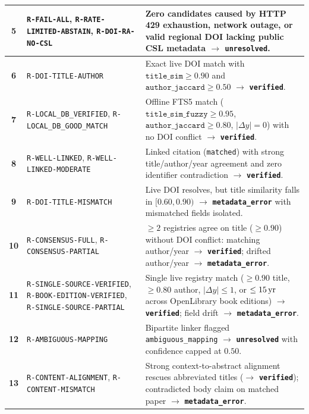 {\begin{longtable}{|C{0.11}|L{0.33}|L{0.56}|}
\hline
\textbf{5} & \texttt{R-FAIL-ALL}, \texttt{R-RATE-LIMITED-\allowbreak ABSTAIN}, \texttt{R-DOI-RA-NO-CSL} & Zero candidates caused by HTTP 429 exhaustion, network outage, or valid regional DOI lacking public CSL metadata $\rightarrow$ \textbf{\texttt{unresolved}}. \\
\hline
\textbf{6} & \texttt{R-DOI-TITLE-AUTHOR} & Exact live DOI match with $\texttt{title\_sim} \ge 0.90$ and $\texttt{author\_jaccard} \ge 0.50$ $\rightarrow$ \textbf{\texttt{verified}}. \\
\hline
\textbf{7} & \texttt{R-LOCAL\_DB\_VERIFIED}, \texttt{R-LOCAL\_DB\_GOOD\_MATCH} & Offline FTS5 match ($\texttt{title\_sim\_fuzzy} \ge 0.95$, $\texttt{author\_jaccard} \ge 0.80$, $|\Delta y| = 0$) with no DOI conflict $\rightarrow$ \textbf{\texttt{verified}}. \\
\hline
\textbf{8} & \texttt{R-WELL-LINKED}, \texttt{R-WELL-LINKED-\allowbreak MODERATE} & Linked citation (\texttt{matched}) with strong title/author/year agreement and zero identifier contradiction $\rightarrow$ \textbf{\texttt{verified}}. \\
\hline
\textbf{9} & \texttt{R-DOI-TITLE-\allowbreak MISMATCH} & Live DOI resolves, but title similarity falls in $[0.60, 0.90)$ $\rightarrow$ \textbf{\texttt{metadata\_error}} with mismatched fields isolated. \\
\hline
\textbf{10} & \texttt{R-CONSENSUS-FULL}, \texttt{R-CONSENSUS-\allowbreak PARTIAL} & $\ge 2$ registries agree on title ($\ge 0.90$) without DOI conflict: matching author/year $\rightarrow$ \textbf{\texttt{verified}}; drifted author/year $\rightarrow$ \textbf{\texttt{metadata\_error}}. \\
\hline
\textbf{11} & \texttt{R-SINGLE-SOURCE-\allowbreak VERIFIED}, \texttt{R-BOOK-EDITION-\allowbreak VERIFIED}, \texttt{R-SINGLE-SOURCE-\allowbreak PARTIAL} & Single live registry match ($\ge 0.90$ title, $\ge 0.80$ author, $|\Delta y| \le 1$, or $\le 15\text{\,yr}$ across OpenLibrary book editions) $\rightarrow$ \textbf{\texttt{verified}}; field drift $\rightarrow$ \textbf{\texttt{metadata\_error}}. \\
\hline
\textbf{12} & \texttt{R-AMBIGUOUS-\allowbreak MAPPING} & Bipartite linker flagged \texttt{ambiguous\_mapping} $\rightarrow$ \textbf{\texttt{unresolved}} with confidence capped at $0.50$. \\
\hline
\textbf{13} & \texttt{R-CONTENT-\allowbreak ALIGNMENT}, \texttt{R-CONTENT-MISMATCH} & Strong context-to-abstract alignment rescues abbreviated titles ($\rightarrow$ \textbf{\texttt{verified}}); contradicted body claim on matched paper $\rightarrow$ \textbf{\texttt{metadata\_error}}. \\

\end{longtable}}
